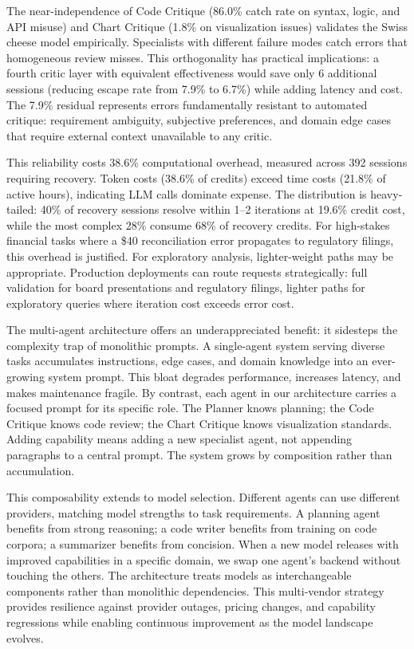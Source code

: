 \documentclass[sigconf]{acmart}
\begin{document}
The near-independence of Code Critique (86.0\% catch rate on syntax, logic, and API misuse) and Chart Critique (1.8\% on visualization issues) validates the Swiss cheese model empirically. Specialists with different failure modes catch errors that homogeneous review misses. This orthogonality has practical implications: a fourth critic layer with equivalent effectiveness would save only 6 additional sessions (reducing escape rate from 7.9\% to 6.7\%) while adding latency and cost. The 7.9\% residual represents errors fundamentally resistant to automated critique: requirement ambiguity, subjective preferences, and domain edge cases that require external context unavailable to any critic.

This reliability costs 38.6\% computational overhead, measured across 392 sessions requiring recovery. Token costs (38.6\% of credits) exceed time costs (21.8\% of active hours), indicating LLM calls dominate expense. The distribution is heavy-tailed: 40\% of recovery sessions resolve within 1--2 iterations at 19.6\% credit cost, while the most complex 28\% consume 68\% of recovery credits. For high-stakes financial tasks where a \$40 reconciliation error propagates to regulatory filings, this overhead is justified. For exploratory analysis, lighter-weight paths may be appropriate. Production deployments can route requests strategically: full validation for board presentations and regulatory filings, lighter paths for exploratory queries where iteration cost exceeds error cost.

The multi-agent architecture offers an underappreciated benefit: it sidesteps the complexity trap of monolithic prompts. A single-agent system serving diverse tasks accumulates instructions, edge cases, and domain knowledge into an ever-growing system prompt. This bloat degrades performance, increases latency, and makes maintenance fragile. By contrast, each agent in our architecture carries a focused prompt for its specific role. The Planner knows planning; the Code Critique knows code review; the Chart Critique knows visualization standards. Adding capability means adding a new specialist agent, not appending paragraphs to a central prompt. The system grows by composition rather than accumulation.

This composability extends to model selection. Different agents can use different providers, matching model strengths to task requirements. A planning agent benefits from strong reasoning; a code writer benefits from training on code corpora; a summarizer benefits from concision. When a new model releases with improved capabilities in a specific domain, we swap one agent's backend without touching the others. The architecture treats models as interchangeable components rather than monolithic dependencies. This multi-vendor strategy provides resilience against provider outages, pricing changes, and capability regressions while enabling continuous improvement as the model landscape evolves.
\end{document}
